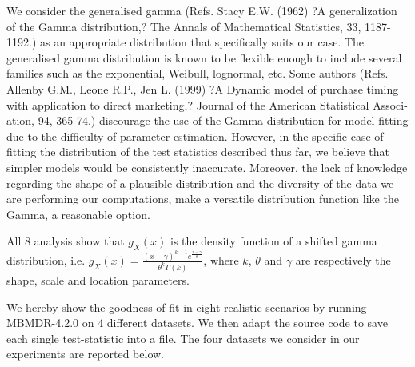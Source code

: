 \documentclass{bmcart}
\begin{document}
We consider the generalised gamma (Refs. Stacy E.W. (1962) ?A generalization of the Gamma distribution,? The Annals of Mathematical Statistics, 33, 1187-1192.) as an appropriate distribution that specifically suits our case. The generalised gamma distribution is known to be flexible enough to include several families such as the exponential, Weibull, lognormal, etc. 
Some authors (Refs. Allenby G.M., Leone R.P., Jen L. (1999) ?A Dynamic model of purchase timing with application to direct marketing,? Journal of the American Statistical Associ- ation, 94, 365-74.) discourage the use of  the Gamma distribution for model fitting due to the difficulty of parameter estimation. However, in the specific case of fitting the distribution of the test statistics described thus far, we believe that simpler models would be consistently inaccurate. Moreover, the lack of knowledge regarding the shape of a plausible distribution and the diversity of the data we are performing our computations, make a versatile distribution function like the Gamma, a reasonable  option.


All 8 analysis show that $g_X(x)$ is the density function of a shifted gamma distribution, i.e. $g_X(x) = \frac{(x-\gamma)^{k-1}e^{\frac{x-\gamma}{\theta}}}{\theta^k\Gamma(k)}$, where $k$, $\theta$ and $\gamma$ are respectively the shape, scale and location parameters. 

We hereby show the goodness of fit in eight realistic scenarios by running MBMDR-4.2.0 on 4 different datasets. We then adapt the source code to save each single test-statistic into a file. The four datasets we consider in our experiments are reported below. 
\end{document}
